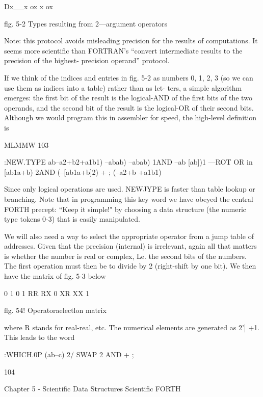 Dx__x ox x ox

 

 

 

flg. 5-2 Types resulting from 2—argument operators

Note: this protocol avoids misleading precision for the results
of computations. It seems more scientific than FORTRAN’s
“convert intermediate results to the precision of the highest-
precision operand” protocol.

 

If we think of the indices and entries in fig. 5-2 as numbers 0, 1,
2, 3 (so we can use them as indices into a table) rather than as let-
ters, a simple algorithm emerges: the first bit of the result is the
logical-AND of the first bits of the two operands, and the second
bit of the result is the logical-OR of their second bits. Although
we would program this in assembler for speed, the high-level
definition is

MLMMW 103

:NEW.TYPE ab--a2+b2+a1b1)
--abab)
--abab)
1AND --ab [ab])1
—ROT OR in [ab1a+b)
2AND (--[ab1a+b]2)
+ ; (--a2+b +a1b1)

Since only logical operations are used. NEWJYPE is faster than
table lookup or branching. Note that in programming this key
word we have obeyed the central FORTH precept: “Keep it
simple!" by choosing a data structure (the numeric type tokens
0-3) that is easily manipulated.

We will also need a way to select the appropriate operator from
a jump table of addresses. Given that the precision (internal) is
irrelevant, again all that matters is whether the number is real or
complex, Le. the second bits of the numbers. The first operation
must then be to divide by 2 (right-shift by one bit). We then have
the matrix of fig. 5-3 below

 

 

0 1 0 1
RR RX 0
XR XX 1

 

 

 

flg. 54! Operatoraelectlon matrix

where R stands for real-real, etc. The numerical elements are
generated as 2'] +1. This leads to the word

:WHICH.0P (ab--c)
2/ SWAP 2 AND + ;

104

Chapter 5 - Scientific Data Structures Scientific FORTH

